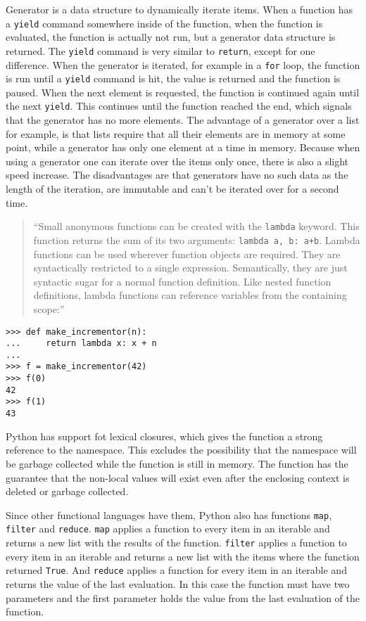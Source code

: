 Generator is a data structure to dynamically iterate items. When a function has
a \texttt{yield} command somewhere inside of the function, when the function is
evaluated, the function is actually not run, but a generator data structure is
returned. The \texttt{yield} command is very similar to \texttt{return}, except
for one difference. When the generator is iterated, for example in a
\texttt{for} loop, the function is run until a \texttt{yield} command is hit,
the value is returned and the function is paused. When the next element is
requested, the function is continued again until the next \texttt{yield}. This
continues until the function reached the end, which signals that the generator
has no more elements. The advantage of a generator over a list for example, is
that lists require that all their elements are in memory at some point, while a generator has only one
element at a time in memory. Because when using a generator one can iterate over the items only once, there is also a slight speed increase. The disadvantages are that generators have no such data as the length of the iteration, are immutable and can't be iterated over for a second time.


\begin{quote}
``Small anonymous functions can be created with the \verb;lambda; keyword. This
function returns the sum of its two arguments: \verb;lambda a, b: a+b;. Lambda
functions can be used wherever function objects are required. They are syntactically restricted to a single expression. Semantically, they are just syntactic sugar for a normal function definition. Like nested function definitions, lambda functions can reference variables from the containing scope:''\cite[4.7.5. Lambda Expressions]{website:python-functions}
\end{quote}
\begin{verbatim}
>>> def make_incrementor(n):
...     return lambda x: x + n
...
>>> f = make_incrementor(42)
>>> f(0)
42
>>> f(1)
43
\end{verbatim}

Python has support fot lexical closures, which gives the function a strong
reference to the namespace. This excludes the possibility that the namespace will be garbage
collected while the function is still in memory. The function has the guarantee
that the non-local values will exist even after the enclosing context is deleted
or garbage collected.\cite{website:python-closures}

Since other functional languages have them, Python also has functions
\verb;map;, \verb;filter; and \verb;reduce;. \verb;map; applies a function
to every item in an iterable and returns a new list with the results of the
function. \verb;filter; applies a function to every item in an iterable and
returns a new list with the items where the function returned \verb;True;. And \verb;reduce; applies a function for every item in an iterable and returns the value of the last evaluation. In this case the function must have two parameters and the first parameter holds the value from the last evaluation of the function.

